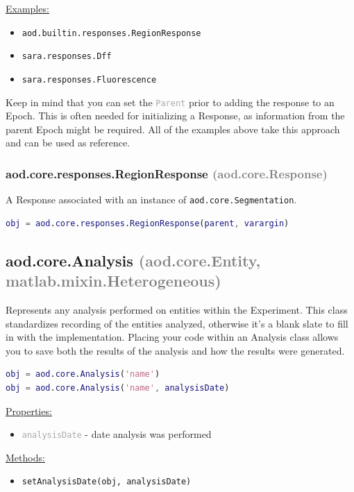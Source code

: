 \documentclass[10pt]{exam}
\newcommand\myparent[1]{\textcolor{gray}{(#1)}}
\newcommand\aodclass[1]{\textcolor{codeblue}{\texttt{#1}}}
\newcommand\aodprop[1]{\textcolor{darkgray}{\texttt{#1}}}
\newcommand\aodfcn[1]{\textcolor{darkteal}{\texttt{#1}}}
\newcommand\docheader[1]{\vspace{0.6ex}\noindent\underline{#1}\vspace{0.15ex}}
\begin{document}
		\docheader{Examples:}
		\begin{itemize}
			\item \aodclass{aod.builtin.responses.RegionResponse}
			\item \aodclass{sara.responses.Dff}
			\item \aodclass{sara.responses.Fluorescence}
		\end{itemize}
		\noindent Keep in mind that you can set the \aodprop{Parent} prior to adding the response to an Epoch. This is often needed for initializing a Response, as information from the parent Epoch might be required. All of the examples above take this approach and can be used as reference.
		
		\subsubsection{aod.core.responses.RegionResponse \myparent{aod.core.Response}}
			\noindent A Response associated with an instance of \aodclass{aod.core.Segmentation}.
			\begin{lstlisting}[language=matlab]
obj = aod.core.responses.RegionResponse(parent, varargin)
			\end{lstlisting}
	
	\subsection{aod.core.Analysis \myparent{aod.core.Entity, matlab.mixin.Heterogeneous}} 
		\noindent Represents any analysis performed on entities within the Experiment. This class standardizes recording of the entities analyzed, otherwise it's a blank slate to fill in with the implementation. Placing your code within an Analysis class allows you to save both the results of the analysis and how the results were generated.
		\begin{lstlisting}[language=matlab]
obj = aod.core.Analysis('name')
obj = aod.core.Analysis('name', analysisDate)
		\end{lstlisting}
		\docheader{Properties:}
		\begin{itemize}
			\item \aodprop{analysisDate} - date analysis was performed
		\end{itemize}
		\docheader{Methods:}
		\begin{itemize}
			\item \aodfcn{setAnalysisDate(obj, analysisDate)}
		\end{itemize}			
\end{document}
